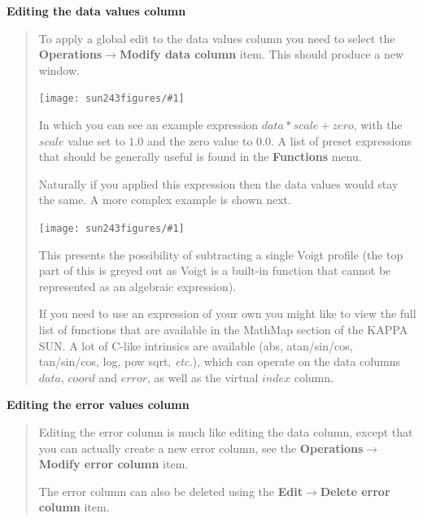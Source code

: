 \documentclass[twoside,11pt]{article}
\newcommand{\htmladdimg}[1]{}
\newcommand{\latexhtml}[2]{#1}
\newcommand{\xref}[3]{#1}
\renewcommand{\_}{\texttt{\symbol{95}}}
\newcommand{\mainfigure}[1]
{\begin{center}
 \latexhtml{\texttt{[image: sun243\_figures/\#1]}}{\htmladdimg{#1.gif}}
 \end{center}
}
\newcommand{\menuitem}[1]{\textbf{#1}}
\newcommand{\submenuitem}[2]{\latexhtml{\textbf{#1$\rightarrow$#2}}{\textbf{#1->#2}}}
\newcommand{\etc}{\textit{etc.}}
\newcommand{\subheading}[1]{\textbf{\large{#1}}}
\begin{document}
\subheading{Editing the data values column}
\begin{quote}
 To apply a global edit to the data values column you need to select
 the \submenuitem{Operations}{Modify data column} item. This should
 produce a new window.

 \mainfigure{dataeditwindow}

 In which you can see an example expression $data*scale+zero$, with
 the $scale$ value set to $1.0$ and the zero value to $0.0$. A list of
 preset expressions that should be generally useful is found in the
 \menuitem{Functions} menu.

 Naturally if you applied this expression then the data values would
 stay the same. A more complex example is shown next.

 \mainfigure{dataeditwindow2}

 This presents the possibility of subtracting a single Voigt profile
 (the top part of this is greyed out as Voigt is a built-in function
 that cannot be represented as an algebraic expression).

 If you need to use an expression of your own you might like to view
 the full list of functions that are available in the MathMap section
 of the \xref{KAPPA SUN}{sun95}{ap_MathMaps}. A lot of C-like
 intrinsics are available (abs, atan/sin/cos, tan/sin/cos, log, pow
 sqrt, \etc), which can operate on the data columns $data$, $coord$
 and $error$, as well as the virtual $index$ column.
\end{quote}

\subheading{Editing the error values column}
\begin{quote}
 Editing the error column is much like editing the data column, except
 that you can actually create a new error column, see the
 \submenuitem{Operations}{Modify error column} item.

 The error column can also be deleted using the
 \submenuitem{Edit}{Delete error column} item.
\end{quote}
\end{document}
